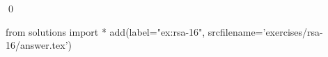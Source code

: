
\begin{ex} 
  \label{ex:rsa-16}
  
  \qed
\end{ex} 
\begin{python0}
from solutions import *
add(label="ex:rsa-16",
    srcfilename='exercises/rsa-16/answer.tex') 
\end{python0}
